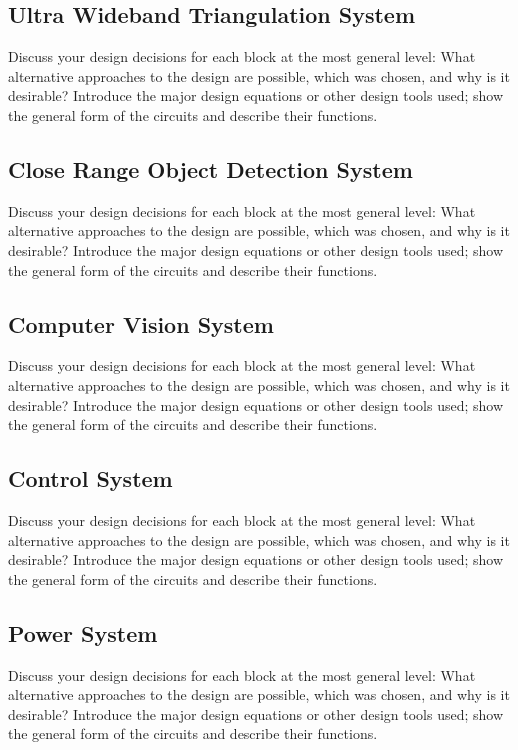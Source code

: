 \documentclass{report}
\begin{document}
    \subsection{Ultra Wideband Triangulation System}
    Discuss your design decisions for each block at the most general level: What alternative approaches to the design are possible, which was chosen, and why is it desirable? Introduce the major design equations or other design tools used; show the general form of the circuits and describe their functions.
    
    \subsection{Close Range Object Detection System}
    Discuss your design decisions for each block at the most general level: What alternative approaches to the design are possible, which was chosen, and why is it desirable? Introduce the major design equations or other design tools used; show the general form of the circuits and describe their functions.
    
    \subsection{Computer Vision System}
    Discuss your design decisions for each block at the most general level: What alternative approaches to the design are possible, which was chosen, and why is it desirable? Introduce the major design equations or other design tools used; show the general form of the circuits and describe their functions.
    
    \subsection{Control System}
    Discuss your design decisions for each block at the most general level: What alternative approaches to the design are possible, which was chosen, and why is it desirable? Introduce the major design equations or other design tools used; show the general form of the circuits and describe their functions.
    
    \subsection{Power System}
    Discuss your design decisions for each block at the most general level: What alternative approaches to the design are possible, which was chosen, and why is it desirable? Introduce the major design equations or other design tools used; show the general form of the circuits and describe their functions.
\end{document}
